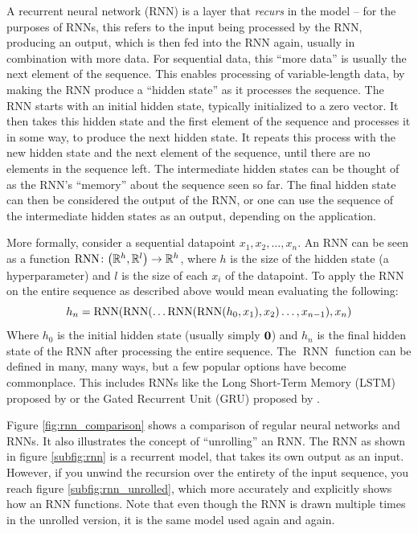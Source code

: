 A recurrent neural network (RNN) is a layer that \textit{recurs} in the model -- for the purposes of RNNs, this refers to the input being processed by the RNN, producing an output, which is then fed into the RNN again, usually in combination with more data. For sequential data, this ``more data'' is usually the next element of the sequence. This enables processing of variable-length data, by making the RNN produce a ``hidden state'' as it processes the sequence. The RNN starts with an initial hidden state, typically initialized to a zero vector. It then takes this hidden state and the first element of the sequence and processes it in some way, to produce the next hidden state. It repeats this process with the new hidden state and the next element of the sequence, until there are no elements in the sequence left. The intermediate hidden states can be thought of as the RNN's ``memory'' about the sequence seen so far. The final hidden state can then be considered the output of the RNN, or one can use the sequence of the intermediate hidden states as an output, depending on the application.

More formally, consider a sequential datapoint $x_1, x_2, \dots, x_n$. An RNN can be seen as a function $\mathrm{RNN} \colon {\mathopen{} \left( \mathbb{R}^h, \mathbb{R}^l \right) \mathclose{}} \to \mathbb{R}^h$, where $h$ is the size of the hidden state (a hyperparameter) and $l$ is the size of each $x_i$ of the datapoint. To apply the RNN on the entire sequence as described above would mean evaluating the following:
\[h_n = \mathrm{RNN}{\mathopen{} \left( \mathrm{RNN}{\mathopen{} \left( \dots \mathrm{RNN}{\mathopen{} \left( \mathrm{RNN}{\mathopen{} \left( h_0, x_1 \right) \mathclose{}}, x_2 \right) \mathclose{}} \dots, x_{n - 1} \right) \mathclose{}}, x_n \right) \mathclose{}}\]
Where $h_0$ is the initial hidden state (usually simply $\bm{ 0 }$) and $h_n$ is the final hidden state of the RNN after processing the entire sequence. The $\operatorname{RNN}$ function can be defined in many, many ways, but a few popular options have become commonplace. This includes RNNs like the Long Short-Term Memory (LSTM) proposed by \textcite{hochreiter1997long} or the Gated Recurrent Unit (GRU) proposed by \textcite{cho2014learning}.

Figure \ref{fig:rnn_comparison} shows a comparison of regular neural networks and RNNs. It also illustrates the concept of ``unrolling'' an RNN. The RNN as shown in figure \ref{subfig:rnn} is a recurrent model, that takes its own output as an input. However, if you unwind the recursion over the entirety of the input sequence, you reach figure \ref{subfig:rnn_unrolled}, which more accurately and explicitly shows how an RNN functions. Note that even though the RNN is drawn multiple times in the unrolled version, it is the same model used again and again.

